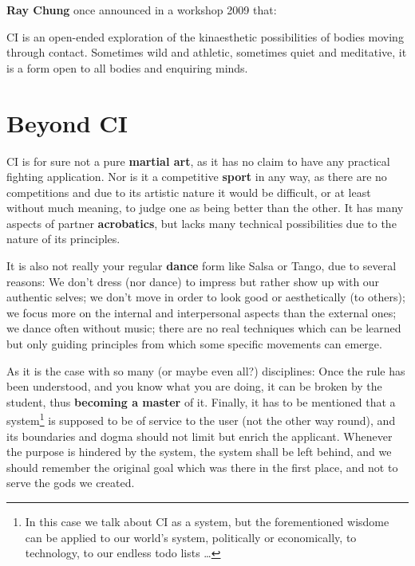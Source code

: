 \textbf{Ray Chung} once announced in a workshop 2009 that:
\begin{displayquote}
	CI is an open-ended exploration of the kinaesthetic possibilities of bodies moving through contact.
	Sometimes wild and athletic, sometimes quiet and meditative, it is a form open to all bodies and enquiring minds.
\end{displayquote}

\section{Beyond CI}\label{sec:beyond-ci}

CI is for sure not a pure \textbf{martial art}, as it has no claim to have any practical fighting application.
Nor is it a competitive \textbf{sport} in any way, as there are no competitions and due to its artistic nature it would be difficult, or at least without much meaning, to judge one as being better than the other.
It has many aspects of partner \textbf{acrobatics}, but lacks many technical possibilities due to the nature of its principles.

It is also not really your regular \textbf{dance} form like Salsa or Tango, due to several reasons: We don't dress (nor dance) to impress but rather show up with our authentic selves; we don't move in order to look good or aesthetically (to others); we focus more on the internal and interpersonal aspects than the external ones; we dance often without music; there are no real techniques which can be learned but only guiding principles from which some specific movements can emerge.

As it is the case with so many (or maybe even all?) disciplines: Once the rule has been understood, and you know what you are doing, it can be broken by the student, thus \textbf{becoming a master} of it.
Finally, it has to be mentioned that a system\footnote{In this case we talk about CI as a system, but the forementioned wisdome can be applied to our world's system, politically or economically, to technology, to our endless todo lists \ldots} is supposed to be of service to the user (not the other way round), and its boundaries and dogma should not limit but enrich the applicant.
Whenever the purpose is hindered by the system, the system shall be left behind, and we should remember the original goal which was there in the first place, and not to serve the gods we created.
